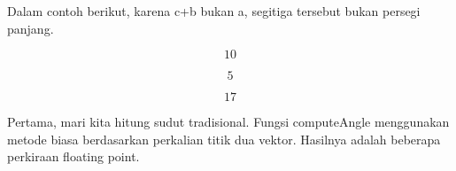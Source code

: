 \documentclass[a4paper,10pt]{article}
\begin{document}
\begin{eulernotebook}
\begin{eulercomment}
\begin{eulercomment}
\begin{eulercomment}
\begin{eulercomment}
\begin{eulercomment}
\begin{eulercomment}
\begin{eulercomment}
\begin{eulercomment}
\begin{eulercomment}
\begin{eulercomment}
\begin{eulercomment}
\begin{eulercomment}
\begin{eulercomment}
\begin{eulercomment}
\begin{eulercomment}
\begin{eulercomment}
\begin{eulercomment}
\begin{eulercomment}
\begin{eulercomment}
\begin{eulercomment}
\begin{eulercomment}
\begin{eulercomment}
\begin{eulercomment}
\begin{eulercomment}
\begin{eulercomment}
\begin{eulercomment}
\begin{eulercomment}
\begin{eulercomment}
\begin{eulercomment}
\begin{eulercomment}
\begin{eulercomment}
\begin{eulercomment}
\begin{eulercomment}
Dalam contoh berikut, karena c+b bukan a, segitiga tersebut bukan
persegi panjang.
\end{eulercomment}
\begin{eulerformula}
\[
10
\]
\end{eulerformula}
\begin{eulerformula}
\[
5
\]
\end{eulerformula}
\begin{eulerformula}
\[
17
\]
\end{eulerformula}
\begin{eulercomment}
Pertama, mari kita hitung sudut tradisional. Fungsi computeAngle
menggunakan metode biasa berdasarkan perkalian titik dua vektor.
Hasilnya adalah beberapa perkiraan floating point.


\end{eulercomment}
\end{eulercomment}
\end{eulercomment}
\end{eulercomment}
\end{eulercomment}
\end{eulercomment}
\end{eulercomment}
\end{eulercomment}
\end{eulercomment}
\end{eulercomment}
\end{eulercomment}
\end{eulercomment}
\end{eulercomment}
\end{eulercomment}
\end{eulercomment}
\end{eulercomment}
\end{eulercomment}
\end{eulercomment}
\end{eulercomment}
\end{eulercomment}
\end{eulercomment}
\end{eulercomment}
\end{eulercomment}
\end{eulercomment}
\end{eulercomment}
\end{eulercomment}
\end{eulercomment}
\end{eulercomment}
\end{eulercomment}
\end{eulercomment}
\end{eulercomment}
\end{eulercomment}
\end{eulercomment}
\end{eulernotebook}
\end{document}
